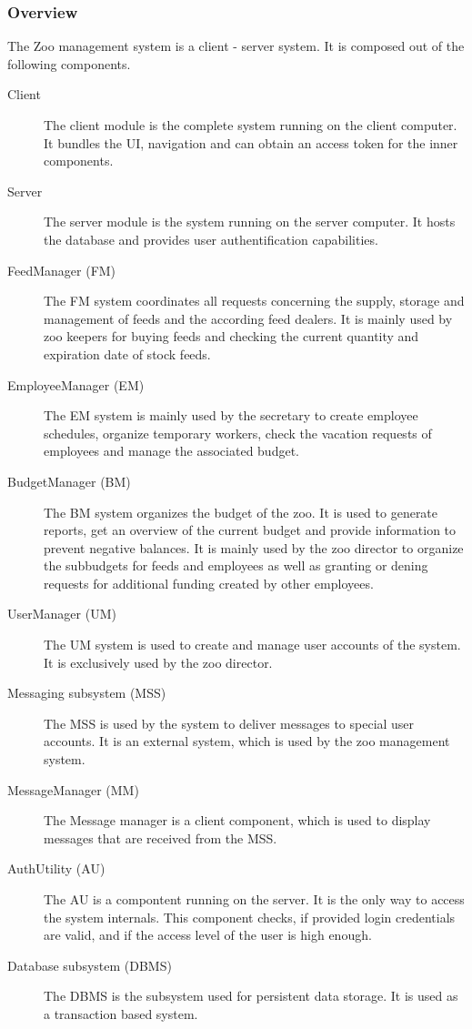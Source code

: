 		\subsubsection{Overview}
		The Zoo management system is a client - server system. It is composed out of the following components.
			\begin{description}
				\item [Client] The client module is the complete system running on the client computer. It bundles the UI, navigation and can obtain an access token for the inner components.
				\item [Server] The server module is the system running on the server computer. It hosts the database and provides user authentification capabilities.
				\item [FeedManager (FM)] The FM system coordinates all requests concerning the supply, storage and management of feeds and the according feed dealers. It is mainly used by zoo keepers for buying feeds and checking the current quantity and expiration date of stock feeds.
				\item [EmployeeManager (EM)] The EM system is mainly used by the secretary to create employee schedules, organize temporary workers, check the vacation requests of employees and manage the associated budget.
				\item [BudgetManager (BM)] The BM system organizes the budget of the zoo. It is used to generate reports, get an overview of the current budget and provide information to prevent negative balances. It is mainly used by the zoo director to organize the subbudgets for feeds and employees as well as granting or dening requests for additional funding created by other employees.
				\item [UserManager (UM)] The UM system is used to create and manage user accounts of the system. It is exclusively used by the zoo director.
				\item [Messaging subsystem (MSS)] The MSS is used by the system to deliver messages to special user accounts. It is an external system, which is used by the zoo management system.
				\item [MessageManager (MM)] The Message manager is a client component, which is used to display messages that are received from the MSS.
				\item [AuthUtility (AU)] The AU is a compontent running on the server. It is the only way to access the system internals. This component checks, if provided login credentials are valid, and if the access level of the user is high enough.
				\item [Database subsystem (DBMS)] The DBMS is the subsystem used for persistent data storage. It is used as a transaction based system.
			\end{description}
